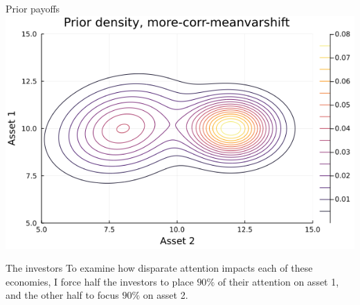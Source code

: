 \documentclass[
  ignorenonframetext,
]{beamer}
\begin{document}
\begin{frame}{Prior payoffs}
\includegraphics[width=0.5\paperheight]{complexity_files/figure-beamer/unnamed-chunk-11-4}
\end{frame}

\begin{frame}{The investors}
\protect\hypertarget{the-investors-1}{}
To examine how disparate attention impacts each of these economies, I
force half the investors to place \(90\%\) of their attention on asset
1, and the other half to focus \(90\%\) on asset 2.
\end{frame}
\end{document}
